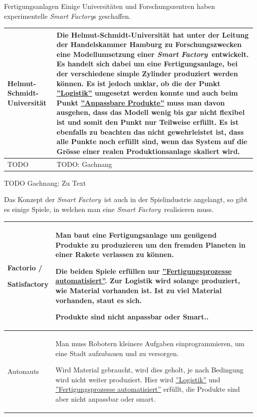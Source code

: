 \documentclass{article}
\def\SmartFactory{\textcolor{DarkestGray}{\textit{Smart Factory}}}
\begin{document}
\begin{Map}{Fertigungsanlagen}
Einige Universitäten und Forschungszentren haben experimentelle \SmartFactory s geschaffen.
\par\medskip
\begin{tabular}{p{3.2cm}p{8cm}}\toprule
  Helmut-Schmidt-Universität & Die Helmut-Schmidt-Universität hat unter der Leitung der Handelskammer Hamburg zu Forschungszwecken eine Modellumsetzung einer \SmartFactory\ entwickelt. Es handelt sich dabei um eine Fertigungsanlage, bei der verschiedene simple Zylinder produziert werden können. Es ist jedoch unklar, ob die der Punkt  \hyperlink{CheckListe:Fertigungsprozess}{''Logistik''} umgesetzt werden konnte und auch beim Punkt \hyperlink{CheckListe:Fertigungsprozess}{''Anpassbare Produkte''} muss man davon ausgehen, dass das Modell wenig bis gar nicht flexibel ist und somit den Punkt nur Teilweise erfüllt. Es ist ebenfalls zu beachten das nicht gewehrleistet ist, dass alle Punkte noch erfüllt sind, wenn das System auf die Grösse einer realen Produktionsanlage skaliert wird.\cite{UniSchmidt}\\\midrule
  TODO & TODO: Gachnang\\\bottomrule
\end{tabular}

TODO Gachnang: Zu Text\par
Das Konzept der \SmartFactory\ ist auch in der Spielindustrie angelangt, so gibt es einige Spiele, in welchen man eine \SmartFactory\ realisieren muss.
\par\medskip
\begin{tabular}{p{3.2cm}p{8cm}}\toprule
  Factorio / \par Satisfactory & Man baut eine Fertigungsanlage um genügend Produkte zu produzieren um den fremden Planeten in einer Rakete verlassen zu können. \par Die beiden Spiele erfüllen nur \hyperlink{CheckListe:Fertigungsprozess}{''Fertigungsprozesse automatisiert''}. Zur Logistik wird solange produziert, wie Material vorhanden ist. Ist zu viel Material vorhanden, staut es sich.\par Produkte sind nicht anpassbar oder Smart.. \\\midrule
  Autonauts & Man muss Robotern kleinere Aufgaben einprogrammieren, um eine Stadt aufzubauen und zu versorgen. \par Wird Material gebraucht, wird dies geholt, je nach Bedingung wird nicht weiter produziert. Hier wird \hyperlink{CheckListe:Logistik}{''Logistik''} und \hyperlink{CheckListe:Fertigungsprozess}{''Fertigungsprozesse automatisiert''} erfüllt, die Produkte sind aber nicht anpassbar oder smart. \\\bottomrule
\end{tabular}
\end{Map}
\end{document}
